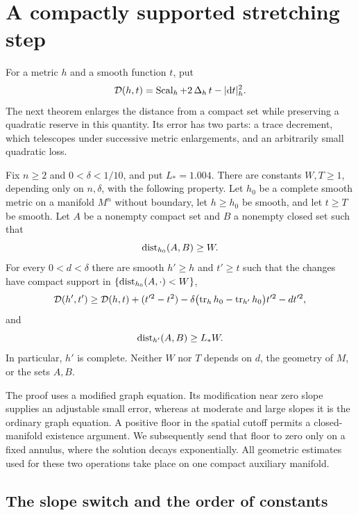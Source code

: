 \section{A compactly supported stretching step}
\label{step:section}

For a metric $h$ and a smooth function $t$, put
\[
 \mathcal D(h,t)=\operatorname{Scal}_h+2\operatorname{\Delta}_h t-|\mathrm d t|_h^2.
\]
The next theorem enlarges the distance from a compact set while preserving
a quadratic reserve in this quantity.  Its error has two parts: a trace
decrement, which telescopes under successive metric enlargements, and an
arbitrarily small quadratic loss.

\begin{theorem}\label{step:main}
Fix $n\ge2$ and $0<\delta<1/10$, and put $L_*=1.004$.  There are
constants $W,T\ge1$, depending only on $n,\delta$, with the following
property.  Let $h_0$ be a complete smooth metric on a manifold $M^n$
without boundary, let $h\ge h_0$ be smooth, and let $t\ge T$ be smooth.
Let $A$ be a nonempty compact set and $B$ a nonempty closed set such that
\[
 \operatorname{dist}_{h_0}(A,B)\ge W.
\]
For every $0<d<\delta$ there are smooth $h'\ge h$ and $t'\ge t$ such that
the changes have compact support in $\{\operatorname{dist}_{h_0}(A,\cdot)<W\}$,
\begin{equation}\label{step:conclusion}
 \mathcal D(h',t')\ge \mathcal D(h,t)+(t'^2-t^2)
 -\delta\bigl(\operatorname{tr}_h h_0-\operatorname{tr}_{h'}h_0\bigr)t'^2-dt'^2,
\end{equation}
and
\begin{equation}\label{step:distance}
 \operatorname{dist}_{h'}(A,B)\ge L_*W.
\end{equation}
In particular, $h'$ is complete.  Neither $W$ nor $T$ depends on $d$,
the geometry of $M$, or the sets $A,B$.
\end{theorem}

The proof uses a modified graph equation.  Its modification near zero
slope supplies an adjustable small error, whereas at moderate and large
slopes it is the ordinary graph equation.  A positive floor in the spatial
cutoff permits a closed-manifold existence argument.  We subsequently send
that floor to zero only on a fixed annulus, where the solution decays
exponentially.  All geometric estimates used for these two operations
take place on one compact auxiliary manifold.

\subsection{The slope switch and the order of constants}

